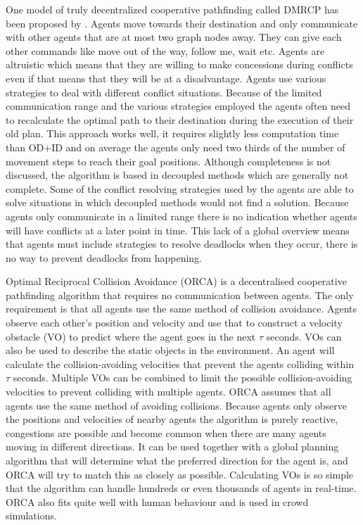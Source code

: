 One model of truly decentralized cooperative pathfinding called DMRCP has been
proposed by \cite{wei2016}. Agents move towards their destination and only
communicate with other agents that are at most two graph nodes away. They can
give each other commands like
move out of the way, follow me, wait etc. Agents are altruistic which means
that they are willing to make concessions during conflicts even if that means
that they will be at a disadvantage. Agents use various strategies to deal with
different conflict situations. Because of the limited communication range and
the various strategies employed the agents often need to recalculate the
optimal path to their destination during the execution of their old plan. This
approach works well, it requires slightly less computation time than OD+ID and
on average the agents only need two thirds of the number of movement steps to
reach their goal positions. Although completeness is not discussed, the
algorithm is based in decoupled methods which are generally not complete. Some
of the conflict resolving strategies used by the agents are able to solve
situations in which decoupled methods would not find a solution.
Because agents only communicate in a limited range there is no indication
whether agents will have conflicts at a later point in time. This lack of a
global overview means that agents must include strategies to resolve deadlocks
when they occur, there is no way to prevent deadlocks from happening.

Optimal Reciprocal Collision Avoidance (ORCA) \cite{vandenberg2011} is a
decentralised cooperative pathfinding algorithm that requires no communication
between agents. The only requirement is that all agents use the same method of
collision avoidance. Agents observe each other's position and velocity and use
that to construct a velocity obstacle (VO) to predict where the agent goes in
the next $\tau$ seconds. VOs can also be used to describe the static objects in
the environment. An agent will calculate the collision-avoiding velocities that
prevent the agents colliding within $\tau$ seconds. Multiple VOs can be
combined to limit the possible collision-avoiding velocities to prevent
colliding with multiple agents. ORCA assumes that all agents use the same
method of avoiding collisions. Because agents only observe the positions and
velocities of nearby agents the algorithm is purely reactive, congestions are
possible and become common when there are many agents moving in different
directions. It can be used together with a global planning algorithm that will
determine what the preferred direction for the agent is, and ORCA will try to
match this as closely as possible. Calculating VOs is so simple that the
algorithm can handle hundreds or even thousands of agents in real-time. ORCA
also fits quite well with human behaviour and is used in crowd simulations.

